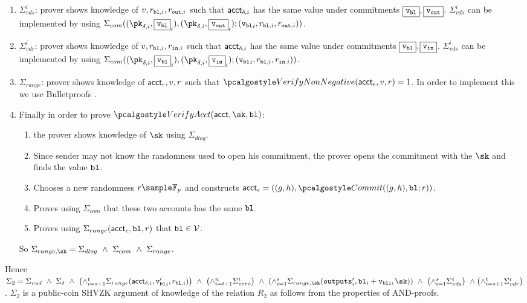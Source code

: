 \begin{enumerate}
     \item $\Sigma^{i}_{vds}$: prover shows knowledge of $v, r_{\textup{\texttt{{bl}}},i}, r_{\textup{\texttt{{out}}},i}$ such that $\textup{\textsf{acct}}_{\delta,i}$ has the same value under commitments $\fbox{$\textup{\texttt{{v}}}_{\textup{\texttt{{bl}}}}$}, \fbox{$\textup{\texttt{{v}}}_{\textup{\texttt{{out}}}}$}$.
     $\Sigma^{i}_{vds}$ can be implemented by using $\Sigma_{com}((\pk_{\delta,i}, \comm{\vbl}_i), (\pk_{\delta,i}, \comm{\vout}_i); ({\vbl}_i, r_{\varbl,i}, r_{\varout,i}))$.

     \item $\Sigma^{i}_{vdr}$: prover shows knowledge of $v, r_{\textup{\texttt{{bl}}},i}, r_{\textup{\texttt{{in}}},i}$ such that $\textup{\textsf{acct}}_{\delta,i}$ has the same value under commitments $\fbox{$\textup{\texttt{{v}}}_{\textup{\texttt{{bl}}}}$}, \fbox{$\textup{\texttt{{v}}}_{\textup{\texttt{{in}}}}$}$.
     $\Sigma^{i}_{vds}$ can be implemented by using $\Sigma_{com}((\pk_{\delta,i}, \comm{\vbl}_i), (\pk_{\delta,i}, \comm{\vin}_i); ({\vbl}_i, r_{\varbl,i}, r_{\varin,i}))$.

     \item $\Sigma_{range}$: prover shows knowledge of $\textup{\textsf{acct}}_{\epsilon}, v, r$ such that $\vernonneg(\acct_{\epsilon},v,r)=1$. In order to implement this we use Bulletproofs \cite{Bulletproofs}.

     \item Finally in order to prove $\veract(\acct, \sk, \varbl)$:
     \begin{enumerate}
        \item the prover shows knowledge of $\sk$ using $\Sigma_{dlog}$. 
        \item Since sender may not know the randomness used to open his commitment, the prover opens the commitment with the $\sk$ and finds the value $\textup{\texttt{{bl}}}$.
        \item Chooses a new randomness $r \sample \mathbb{F}_p$ and constructs $\acct_{\epsilon} = ((g,h), \commit((g,h),\varbl;r))$.
        \item Proves using $\Sigma_{com}$ that these two accounts has the same $\textup{\texttt{{bl}}}$.
        \item Proves using $\Sigma_{range}(\textup{\textsf{acct}}_{\epsilon}, \textup{\texttt{{bl}}}, r)$ that $\textup{\texttt{{bl}}} \in \mathcal{V}$. 
     \end{enumerate}
     So $\Sigma_{range, \sk} = \Sigma_{dlog} \ \land \ \Sigma_{com} \ \land \ \Sigma_{range}$.

\end{enumerate}
Hence $\Sigma_2 = \Sigma_{vud} \ \land \ \Sigma_{\delta} \ \land \ \left( \land_{i=s+1}^{t} \Sigma_{range}(\acct_{\delta,i}, {\vbl'}_i, r_{\varbl,i}) \right) \ \land \ \left( \land_{i=t+1}^{n} \Sigma^{i}_{zero} \right) \ \land \ \left( \land_{i=1}^{s} \Sigma_{range, \sk}(\outputs'_i, \varbl_i + {\vbl}_i, \sk) \right) \ \land \ \left( \land_{i=1}^{s} \Sigma^{i}_{vds} \right) \ \land \left( \land_{i=s+1}^{t} \Sigma^{i}_{vdr} \right)$. $\Sigma_2$ is a public-coin SHVZK argument of knowledge of the relation $R_2$ as follows from the properties of AND-proofs.

